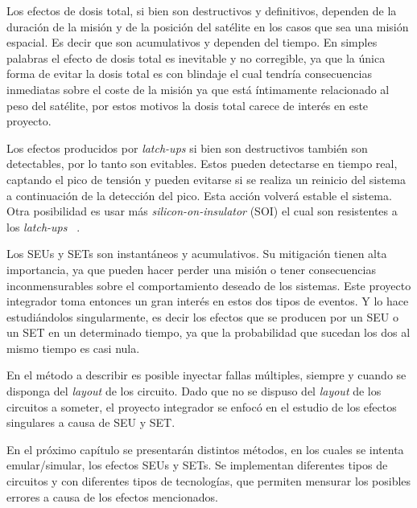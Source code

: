 Los efectos de dosis total, si bien son destructivos y definitivos, dependen de la duración de la misión y de la posición del satélite en los casos que sea una misión espacial. Es decir que son acumulativos y dependen del tiempo. 
En simples palabras el efecto de dosis total es inevitable y no corregible, ya que la única forma de evitar la dosis total es con blindaje el cual tendría consecuencias inmediatas sobre el coste de la misión ya que está íntimamente relacionado al peso del satélite, por estos motivos la dosis total  carece de interés en este proyecto.

Los efectos producidos por \textit{latch-ups} si bien son destructivos también son detectables, por lo tanto son evitables. Estos pueden detectarse en tiempo real, captando el pico de tensión y pueden evitarse si se realiza  un reinicio del sistema a continuación de la detección del pico. Esta acción  volverá estable el sistema.
Otra posibilidad es usar más \textit{silicon-on-insulator} (SOI) el cual son resistentes a los \textit{latch-ups} ~\cite{340569}.

Los SEUs y SETs son instantáneos y acumulativos. Su mitigación tienen alta importancia, ya que pueden hacer perder una misión o tener consecuencias inconmensurables sobre el comportamiento deseado de los sistemas. Este proyecto integrador  toma entonces un gran interés en estos dos tipos de eventos. Y lo hace estudiándolos singularmente, es decir los efectos que se producen por un SEU o un SET en un determinado tiempo, ya que la probabilidad que sucedan los dos al mismo tiempo es casi nula.

En el método a describir es posible inyectar fallas múltiples, siempre y cuando se disponga del \textit{layout} de los circuito. Dado que no se dispuso del \textit{layout} de los circuitos a someter, el proyecto integrador se enfocó en el estudio de los efectos singulares a causa  de SEU y SET. 

En el próximo capítulo se presentarán distintos métodos, en los cuales se intenta emular/simular, los efectos  SEUs y SETs. Se implementan diferentes tipos de circuitos y con diferentes tipos de tecnologías, que permiten  mensurar los posibles errores a causa de los efectos mencionados.